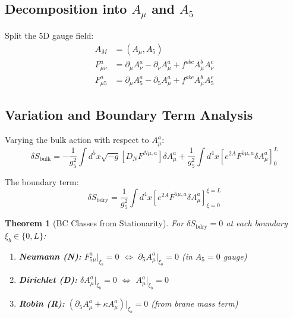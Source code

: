 \documentclass[11pt,a4paper]{article}
\newtheorem{theorem}{Theorem}[section]
\begin{document}
\subsection{Decomposition into $A_\mu$ and $A_5$}

Split the 5D gauge field:
\begin{align}
  A_M &= (A_\mu, A_5)
  \label{eq:am-split} \\
  F_{\mu\nu}^a &= \partial_\mu A_\nu^a - \partial_\nu A_\mu^a + f^{abc} A_\mu^b A_\nu^c
  \label{eq:fmunu} \\
  F_{\mu 5}^a &= \partial_\mu A_5^a - \partial_5 A_\mu^a + f^{abc} A_\mu^b A_5^c
  \label{eq:fmu5}
\end{align}

\subsection{Variation and Boundary Term Analysis}

Varying the bulk action with respect to $A_\mu^a$:
\begin{equation}
  \delta S_{\text{bulk}} = -\frac{1}{g_5^2} \int d^5x \sqrt{-g}
    \left[ D_N F^{N\mu,a} \right] \delta A_\mu^a
    + \frac{1}{g_5^2} \int d^4x \left[ e^{2A} F^{5\mu,a} \delta A_\mu^a \right]_0^L
  \label{eq:bulk-variation}
\end{equation}

The boundary term:
\begin{equation}
  \delta S_{\text{bdry}} = \frac{1}{g_5^2} \int d^4x
    \left[ e^{2A} F^{5\mu,a} \delta A_\mu^a \right]_{\xi=0}^{\xi=L}
  \label{eq:boundary-term}
\end{equation}

\begin{theorem}[BC Classes from Stationarity]
\label{thm:bc-classes}
For $\delta S_{\text{bdry}} = 0$ at each boundary $\xi_b \in \{0, L\}$:
\begin{enumerate}
  \item \textbf{Neumann (N):} $F_{5\mu}^a|_{\xi_b} = 0$
        $\Leftrightarrow$ $\partial_5 A_\mu^a|_{\xi_b} = 0$ (in $A_5=0$ gauge)
  \item \textbf{Dirichlet (D):} $\delta A_\mu^a|_{\xi_b} = 0$
        $\Leftrightarrow$ $A_\mu^a|_{\xi_b} = 0$
  \item \textbf{Robin (R):} $(\partial_5 A_\mu^a + \kappa A_\mu^a)|_{\xi_b} = 0$
        (from brane mass term)
\end{enumerate}
\end{theorem}
\end{document}
